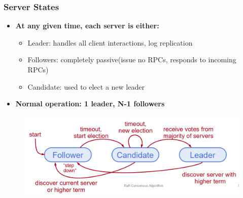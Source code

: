 \begin{frame}
    \frametitle{Server States}
    \begin{itemize}
        \item \textbf{At any given time, each server is either:}
            \begin{itemize}
                \item \alert{Leader}: handles all client interactions, log replication
                \item \alert{Followers}: completely passive(issue no RPCs, responds to incoming RPCs)
                \item \alert{Candidate}: used to elect a new leader
            \end{itemize}
        \item \textbf{Normal operation: 1 leader, N-1 followers}
    \end{itemize}
    \begin{figure}
        \centering
        \includegraphics[scale=0.3]{./figures/raft-servers.png}
    \end{figure}
\end{frame}

